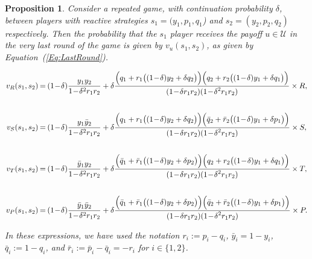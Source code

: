 \documentclass[11pt]{article}
\theoremstyle{plainCl1}
\newtheorem{Prop}{Proposition}
\theoremstyle{plainCl2}
\begin{document}
\begin{Prop}\label{proposition:last_round} Consider a repeated game, with
    continuation probability $\delta$, between players with reactive strategies
    $s_1\!=\!(y_1, p_1, q_1$)  and $s_2\!=\!(y_2,p_2,q_2)$ respectively. Then
    the probability that the $s_1$ player receives the payoff $u\!\in\!
    \mathcal{U}$ in the very last round of the game is given by
    $v_{u}(s_1,s_2)$, as given by Equation~(\ref{Eq:LastRound}).

    \begin{equation} \label{Eq:LastRound}
      \setlength{\arraycolsep}{1pt}
      \begin{array}{rcl}
    
      v_{R}(s_1,s_2) &= &\displaystyle (1\!-\!\delta)\frac{y_1y_2}{1\!-\!\delta^2 r_1 r_2}+\delta \frac{\Big(q_1+r_1\big((1\!-\!\delta)y_2+\delta q_2\big)\Big) \Big(q_2+r_2\big((1\!-\!\delta)y_1+\delta q_1\big)\Big)}
      {\displaystyle(1\!-\!\delta r_1r_2)(1\!-\!\delta^2 r_1 r_2)} \times R,\\[1cm]
    
      v_{S}(s_1,s_2) &= &\displaystyle (1\!-\!\delta)\frac{y_1\bar{y}_2}{1\!-\!\delta^2 r_1 r_2}+\delta \frac{\Big(q_1+r_1\big((1\!-\!\delta)y_2+\delta q_2\big)\Big) \Big(\bar{q}_2+\bar{r}_2\big((1\!-\!\delta)y_1+\delta p_1\big)\Big)}
      {\displaystyle(1\!-\!\delta r_1r_2)(1\!-\!\delta^2 r_1 r_2)} \times S,\\[1cm]
    
      v_{T}(s_1,s_2) &= &\displaystyle (1\!-\!\delta)\frac{\bar{y}_1y_2}{1\!-\!\delta^2 r_1 r_2}+\delta \frac{\Big(\bar{q}_1+\bar{r}_1\big((1\!-\!\delta)y_2+\delta p_2\big)\Big) \Big(q_2+r_2\big((1\!-\!\delta)y_1+\delta q_1\big)\Big)}
      {\displaystyle(1\!-\!\delta r_1r_2)(1\!-\!\delta^2 r_1 r_2)} \times T,\\[1cm]
    
      v_{P}(s_1,s_2) &= &\displaystyle (1\!-\!\delta)\frac{\bar{y}_1\bar{y}_2}{1\!-\!\delta^2 r_1 r_2}+\delta \frac{\Big(\bar{q}_1+\bar{r}_1\big((1\!-\!\delta)y_2+\delta p_2\big)\Big) \Big(\bar{q}_2+\bar{r}_2\big((1\!-\!\delta)y_1+\delta p_1\big)\Big)}
      {\displaystyle(1\!-\!\delta r_1r_2)(1\!-\!\delta^2 r_1 r_2)} \times P.
      \end{array}
    \end{equation}

In these expressions, we have used the notation $r_i:=p_i\!-\!q_i$,
$\bar{y}_i\!=\!1\!-\!y_i$, $\bar{q}_i:=1\!-\!q_i$, and
$\bar{r}_i:=\bar{p}_i\!-\!\bar{q}_i=-r_i$ for $i\!\in\!\{1,2\}$.
\end{Prop}
\end{document}
